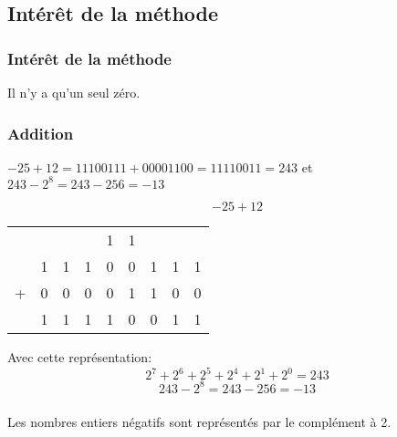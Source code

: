 \documentclass[svgnames,11pt]{beamer}
\begin{document}
\subsection{Intérêt de la méthode}
\begin{frame}
    \frametitle{Intérêt de la méthode}
\begin{center}
        Il n'y a qu'un seul zéro.
    
\end{center}

\end{frame}
\begin{frame}
    \frametitle{Addition}

    $-25+12= 11100111+00001100 = 11110011 = 243$ et $243-2^8=243-256=-13$

    $$-25+12$$
    \begin{center}
        \begin{tabular}{*{9}{c}}
              &   &   &  & {\small 1} &  {\small 1} &   &   &   \\
              & 1 & 1 & 1          & 0          & 0 & 1 & 1 & 1 \\
            + & 0 & 0 & 0          & 0          & 1 & 1 & 0 & 0 \\
            \hline
              & 1 & 1 & 1          & 1          & 0 & 0 & 1 & 1 \\
        \end{tabular}
    \end{center}
    Avec cette représentation:
    $$2^7+2^6+2^5+2^4+2^1+2^0=243$$
    $$243 -2^8 = 243-256=-13$$
    
\end{frame}
\begin{frame}
    \frametitle{}

    \begin{aretenir}[]
        Les nombres entiers négatifs sont représentés par le complément à 2.
            \end{aretenir}

\end{frame}
\end{document}
